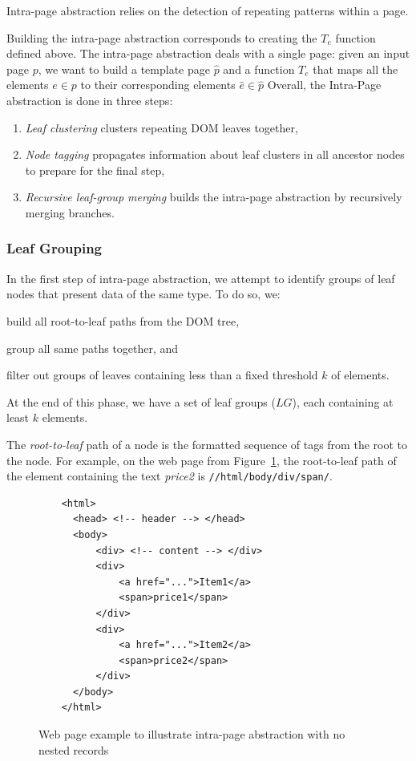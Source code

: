 Intra-page abstraction relies on the detection of repeating patterns within a page. 

Building the intra-page abstraction corresponds to creating the $T_e$ function defined above.
The intra-page abstraction deals with a single page: given an input page $p$, we want to build a template page $\hat{p}$ and a function $T_e$ that maps all the elements $e \in p$  to their corresponding elements $\hat{e} \in \hat{p}$
Overall, the Intra-Page abstraction is done in three steps:
\begin{enumerate}
  \item \emph{Leaf clustering} clusters repeating DOM leaves together,
  \item \emph{Node tagging} propagates information about leaf clusters in all ancestor nodes to prepare for the final step,
  \item \emph{Recursive leaf-group merging} builds the intra-page abstraction by recursively merging branches.
\end{enumerate}

\subsubsection{Leaf Grouping}
In the first step of intra-page abstraction, we attempt to identify groups of leaf nodes that present data of the same type.
To do so, we:
\begin{inparaenum}
  \item build all root-to-leaf paths from the DOM tree,
  \item group all same paths together, and
  \item filter out groups of leaves containing less than a fixed threshold $k$ of elements.
\end{inparaenum}
At the end of this phase, we have a set of leaf groups ($LG$), each containing at least $k$ elements.

The \emph{root-to-leaf} path of a node is the formatted sequence of tags from the root to the node.
For example, on the web page from Figure~\ref{fig:non_recursive_html}, the root-to-leaf path of the element containing the text \emph{price2} is \lstinline{//html/body/div/span/}.

\begin{figure}[ht]
  \centering
  \begin{lstlisting}
    <html>
      <head> <!-- header --> </head>
      <body>
          <div> <!-- content --> </div>
          <div>
              <a href="...">Item1</a>
              <span>price1</span>
          </div>
          <div>
              <a href="...">Item2</a>
              <span>price2</span>
          </div>
      </body>
    </html>
  \end{lstlisting}
  \caption{Web page example to illustrate intra-page abstraction with no nested records}
  \label{fig:non_recursive_html}
\end{figure}

